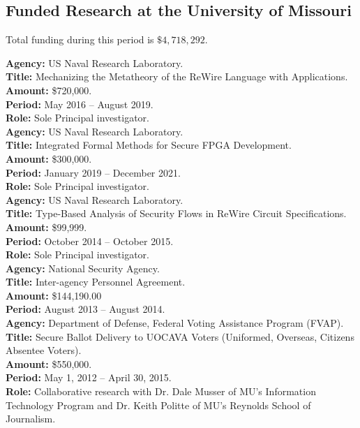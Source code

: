 \documentclass[12pt]{article} %
\begin{document}
\subsection*{Funded Research at the University of Missouri} 

Total funding during this period is $\$4,718,292$.
 
{\bf Agency:} US Naval Research Laboratory.
\\
{\bf Title:} Mechanizing the Metatheory of the ReWire Language with Applications.
\\
{\bf Amount:} \$720,000.
\\
{\bf Period:}   May 2016  --  August 2019.
\\
{\bf Role:}    Sole  Principal investigator.
\\
{\bf Agency:} US Naval Research Laboratory.
\\
{\bf Title:} Integrated Formal Methods for Secure FPGA Development.
\\
{\bf Amount:} \$300,000.
\\
{\bf Period:}   January 2019  --  December 2021.
\\
{\bf Role:}    Sole  Principal investigator.
\\


{\bf Agency:} US Naval Research Laboratory.
\\
{\bf Title:} Type-Based Analysis of Security Flows in ReWire Circuit Specifications.
\\
{\bf Amount:} \$99,999.
\\
{\bf Period:}   October 2014  --  October 2015.
\\
{\bf Role:}     Sole Principal investigator.
\\

{\bf Agency:} National Security Agency.\\
{\bf Title:} Inter-agency Personnel Agreement.\\
{\bf Amount:} \$144,190.00 \\
{\bf Period:} August 2013 -- August 2014.
\\


{\bf Agency:} Department of Defense, Federal Voting Assistance Program (FVAP).
\\
{\bf Title:} Secure Ballot Delivery to UOCAVA Voters (Uniformed, Overseas, Citizens Absentee Voters). 
\\
{\bf Amount:} \$550,000.
\\
{\bf Period:} May 1, 2012 -- April 30, 2015.
\\
{\bf Role:} Collaborative research with Dr. Dale Musser of MU's Information Technology Program and Dr. Keith Politte of MU's Reynolds School of Journalism. 
\\
\end{document}
